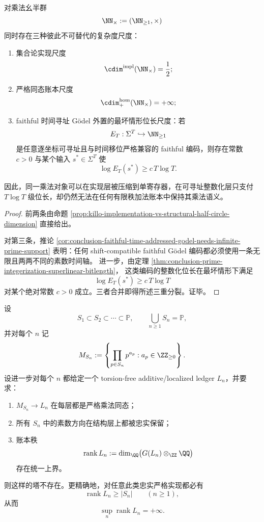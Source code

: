 \begin{corollary}\label{cor:derived-prime-register-triple-complexity-splitting}
对乘法幺半群
\[
\NN_{\times}:=(\NN_{\ge 1},\times)
\]
同时存在三种彼此不可替代的复杂度尺度：
\begin{enumerate}
\normalfont
  \item 集合论实现尺度
  \[
  \cdim^{\mathrm{impl}}(\NN_{\times})=\frac12;
  \]
  \item 严格同态账本尺度
  \[
  \cdim^{\mathrm{hom}}_{+}(\NN_{\times})=+\infty;
  \]
  \item faithful 时间寻址 Gödel 外置的最坏情形位长尺度：若
  \[
  E_T:\Sigma^T\hookrightarrow \NN_{\ge 1}
  \]
  是任意逐坐标可寻址且与时间移位严格兼容的 faithful 编码，则存在常数 \(c>0\) 与某个输入 \(s^\ast\in \Sigma^T\) 使
  \[
  \log E_T(s^\ast)\ge c\,T\log T.
  \]
\end{enumerate}
因此，同一乘法对象可以在实现层被压缩到单寄存器，在可寻址整数化层只支付 \(T\log T\) 级位长，却仍然无法在任何有限秩加法账本中保持其乘法语义。
\end{corollary}

\begin{proof}
前两条由命题 \ref{prop:killo-implementation-vs-structural-half-circle-dimension}
直接给出。

对第三条，推论 \ref{cor:conclusion-faithful-time-addressed-godel-needs-infinite-prime-support}
表明：任何 shift-compatible faithful Gödel 编码都必须使用一条无限且两两不同的素数时间轴。
进一步，由定理 \ref{thm:conclusion-prime-integerization-superlinear-bitlength}，
这类编码的整数化位长在最坏情形下满足
\[
\log E_T(s^\ast)\ge c\,T\log T
\]
对某个绝对常数 \(c>0\) 成立。三者合并即得所述三重分裂。证毕。
\end{proof}

\begin{theorem}\label{thm:derived-cofinal-prime-support-unbounded-ledger-rank}
设
\[
S_1\subset S_2\subset\cdots\subset \mathbb P,
\qquad
\bigcup_{n\ge 1}S_n=\mathbb P,
\]
并对每个 \(n\) 记
\[
M_{S_n}:=\left\{\prod_{p\in S_n}p^{a_p}:a_p\in \ZZ_{\ge 0}\right\}.
\]
设进一步对每个 \(n\) 都给定一个 torsion-free additive/localized ledger \(L_n\)，并要求：
\begin{enumerate}
\normalfont
  \item \(M_{S_n}\to L_n\) 在每层都是严格乘法同态；
  \item 所有 \(S_n\) 中的素数方向在结构层上都被忠实保留；
  \item 账本秩
  \[
  \operatorname{rank}L_n:=\dim_{\QQ}\bigl(G(L_n)\otimes_{\ZZ}\QQ\bigr)
  \]
  存在统一上界。
\end{enumerate}
则这样的塔不存在。更精确地，对任意此类忠实严格实现都必有
\[
\operatorname{rank}L_n\ge |S_n|
\qquad (n\ge 1),
\]
从而
\[
\sup_n \operatorname{rank}L_n=+\infty.
\]
\end{theorem}

